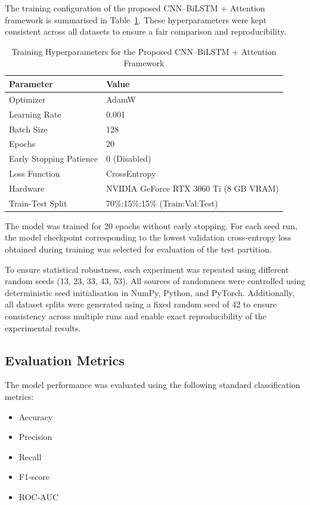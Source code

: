 \documentclass[a4paper,fleqn]{cas-sc}
\begin{document}
{\color{blue}The training configuration of the proposed CNN--BiLSTM + Attention framework is summarised in Table~\ref{tab:hyperparams}.} These hyperparameters were kept consistent across all datasets to ensure a fair comparison and reproducibility.

\begin{table}
\centering
\caption{Training Hyperparameters for {\color{blue}the Proposed CNN--BiLSTM + Attention Framework}}
\label{tab:hyperparams}
\begin{tabular}{ll}
\toprule
\textbf{Parameter} & \textbf{Value} \\
\midrule
Optimizer & AdamW \\
Learning Rate & 0.001 \\
Batch Size & 128 \\
Epochs & 20 \\
Early Stopping Patience & 0 (Disabled) \\
Loss Function & CrossEntropy \\
{\color{blue}Hardware} & {\color{blue}NVIDIA GeForce RTX 3060 Ti (8 GB VRAM)} \\
Train-Test Split & 70\%:15\%:15\% (Train:Val:Test) \\
\bottomrule
\end{tabular}
\end{table}

The model was trained for 20 epochs without early stopping. For each seed run, the model checkpoint corresponding to the lowest validation cross-entropy loss obtained during training was selected for evaluation of the test partition. 


To ensure statistical robustness, each experiment was repeated using different random seeds (13, 23, 33, 43, 53). All sources of randomness were controlled using deterministic seed initialisation in NumPy, Python, and PyTorch. Additionally, all dataset splits were generated using a fixed random seed of 42 to ensure consistency across multiple runs and enable exact reproducibility of the experimental results.

\subsection{Evaluation Metrics}

The model performance was evaluated using the following standard classification metrics:

\begin{itemize}
    \item Accuracy
    \item Precision
    \item Recall
    \item F1-score
    \item ROC-AUC
\end{itemize}
\end{document}
